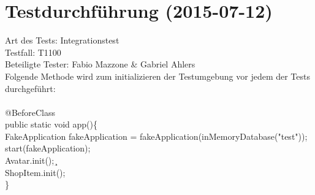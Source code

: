 \chapter{Testdurchführung (2015-07-12)}

Art des Tests: Integrationstest\\
Testfall: T1100\\
Beteiligte Tester: Fabio Mazzone \& Gabriel Ahlers\\

Folgende Methode wird zum initializieren der Testumgebung vor jedem der Tests durchgeführt:\\\\
\hspace*{0mm}@BeforeClass \\
\hspace*{0mm}public static void app()\{ \\
\hspace*{3mm}FakeApplication fakeApplication = fakeApplication(inMemoryDatabase("test")); \\
\hspace*{3mm}start(fakeApplication); \\
\hspace*{3mm}Avatar.init();¸\\
\hspace*{3mm}ShopItem.init(); \\
\hspace*{0mm}\} \\\\

\newpage
